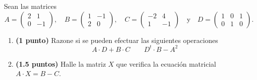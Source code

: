 
Sean las matrices
\[
A=\begin{pmatrix}2&1\\0&-1\end{pmatrix},\quad B=\begin{pmatrix}1&-1\\2&0\end{pmatrix},\quad C=\begin{pmatrix}-2&4\\1&-1\end{pmatrix}\quad\text{y}\quad D=\begin{pmatrix}1&0&1\\0&1&0\end{pmatrix}.
\]
\begin{enumerate}[label=\alph*)]
\item \textbf{(1 punto)} Razone si se pueden efectuar las siguientes operaciones
\[
A\cdot D+B\cdot C\qquad D^t\cdot B-A^2
\]
\item \textbf{(1.5 puntos)} Halle la matriz $X$ que verifica la ecuación matricial $A\cdot X=B-C$.
\end{enumerate}
